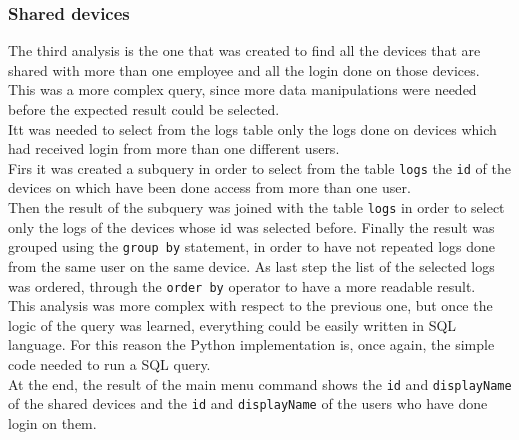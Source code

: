 \documentclass[12pt, a4paper, oneside]{article}
\begin{document}
\subsubsection{Shared devices}
\label{subsubsec:shared}
The third analysis is the one that was created to find all the devices that are shared with more than one employee and all the login done on those devices.\\
This was a more complex query, since more data manipulations were needed before the expected result could be selected.\\
Itt was needed to select from the logs table only the logs done on devices which had received login from more than one different users.\\
Firs it was created a subquery in order to select from the table \texttt{logs} the \texttt{id} of the devices on which have been done access from more than one user.\\ 
Then the result of the subquery was joined with the table \texttt{logs} in order to select only the logs of the devices whose id was selected before. Finally the result was grouped using the \texttt{group by}
statement, in order to have not repeated logs done from the same user on the same device. As last step the list of the selected logs was ordered, through the \texttt{order by} operator to have a more 
readable result.\\  
This analysis was more complex with respect to the previous one, but once the logic of the query was learned, everything could be easily written in SQL language.
For this reason the Python implementation is, once again, the simple code needed to run a SQL query.\\
At the end, the result of the main menu command shows the \texttt{id} and \texttt{displayName} of the shared devices and the \texttt{id} and \texttt{displayName} of the users who have done login on them.
\end{document}

